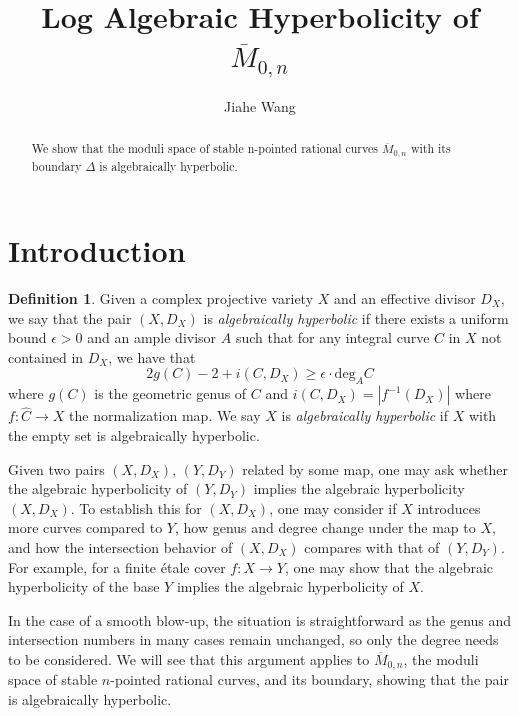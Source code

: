 \documentclass{amsart}
\theoremstyle{definition}
\newtheorem{definition}[theorem]{Definition}
\theoremstyle{remark}
\begin{document}
\pagestyle{plain}

\title{Log Algebraic Hyperbolicity of $\overline{M}_{0,n}$}

\author[J. Wang]{Jiahe Wang}
\address{UCLA Mathematics Department, Box 951555, Los Angeles, CA 90095-1555, USA
}



\begin{abstract}
We show that the moduli space of stable n-pointed rational curves $\overline{M}_{0,n}$ with its boundary $\Delta$ is algebraically hyperbolic.
\end{abstract}

\maketitle

\section{Introduction}

\begin{definition}
Given a complex projective variety $X$ and an effective divisor $D_X$, we say that the pair $(X,D_X)$ is \emph{algebraically hyperbolic} if there exists a uniform bound $\epsilon>0$ and an ample divisor $A$ such that for any integral curve $C$ in $X$ not contained in $D_X$, we have that \[2g(C)-2+i(C,D_X) \geq \epsilon\cdot \mathrm{deg}_A C\]where $g(C)$ is the geometric genus of $C$ and $i(C,D_X) = |f^{-1}(D_X)|$ where $f:\widehat{C}\rightarrow X$ the normalization map. We say $X$ is \emph{algebraically hyperbolic} if $X$ with the empty set is algebraically hyperbolic. 
\end{definition}
Given two pairs $(X,D_X)$, $(Y,D_Y)$ related by some map, one may ask whether the algebraic hyperbolicity of $(Y,D_Y)$ implies the algebraic hyperbolicity $(X,D_X)$. To establish this for $(X,D_X)$, one may consider if $X$ introduces more curves compared to $Y$, how genus and degree change under the map to $X$, and how the intersection behavior of $(X,D_X)$ compares with that of $(Y,D_Y)$. For example, for a finite étale cover $f:X\rightarrow Y$, one may show that the algebraic hyperbolicity of the base $Y$ implies the algebraic hyperbolicity of $X$. 

In the case of a smooth blow-up, the situation is straightforward as the genus and intersection numbers in many cases remain unchanged, so only the degree needs to be considered. We will see that this argument applies to $\overline{M}_{0,n}$, the moduli space of stable $n$-pointed rational curves, and its boundary, showing that the pair is algebraically hyperbolic.
\end{document}
